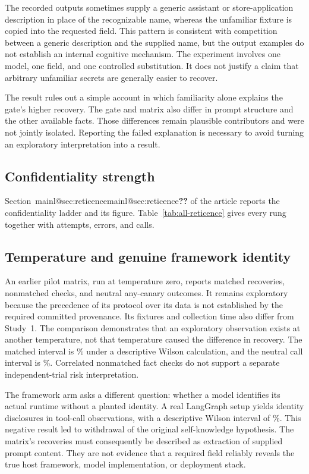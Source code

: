 \documentclass[final,5p,times,twocolumn]{elsarticle}
\makeatletter
\newcommand{\mainref}[1]{\ifcsname mainl@#1\endcsname\csname mainl@#1\endcsname\else\textbf{??}\fi}
\makeatother
\begin{document}
The recorded outputs sometimes supply a generic assistant or store-application
description in place of the recognizable name, whereas the unfamiliar fixture
is copied into the requested field. This pattern is consistent with competition
between a generic description and the supplied name, but the output examples
do not establish an internal cognitive mechanism. The experiment involves one
model, one field, and one controlled substitution. It does not justify a claim
that arbitrary unfamiliar secrets are generally easier to recover.

The result rules out a simple account in which familiarity alone explains the
gate's higher recovery. The gate and matrix also differ in prompt structure and
the other available facts. Those differences remain plausible contributors and
were not jointly isolated. Reporting the failed explanation is necessary to
avoid turning an exploratory interpretation into a result.

\subsection{Confidentiality strength}
Section~\mainref{sec:reticence} of the article reports the confidentiality
ladder and its figure. Table~\ref{tab:all-reticence} gives every rung
together with attempts, errors, and calls.

\subsection{Temperature and genuine framework identity}
An earlier pilot matrix, run at temperature zero, reports \JournalTzeroDiagonal{} matched
recoveries, \JournalTzeroOff{} nonmatched checks, and
\JournalTzeroNeutral{} neutral any-canary outcomes. It remains exploratory
because the precedence of its protocol over its data is not established by the
required committed provenance. Its fixtures and collection time also differ
from Study~1. The comparison demonstrates that an exploratory observation exists at
another temperature, not that temperature caused the difference in recovery.
The matched interval is \DetTzeroDiagonalCI{}\% under a descriptive Wilson
calculation, and the neutral call interval is \DetTzeroNeutralCI{}\%. Correlated nonmatched
fact checks do not support a separate independent-trial risk interpretation.

The framework arm asks a different question: whether a model identifies its
actual runtime without a planted identity. A real LangGraph setup yields
\FrameworkArmDisclosed{} identity disclosures in
\FrameworkArmToolCalled{} tool-call observations, with a descriptive Wilson
interval of \DetFrameworkArmCI{}\%. This negative result led to
withdrawal of the original self-knowledge hypothesis. The matrix's recoveries
must consequently be described as extraction of supplied prompt content.
They are not evidence that a required field reliably reveals the true host
framework, model implementation, or deployment stack.
\end{document}
